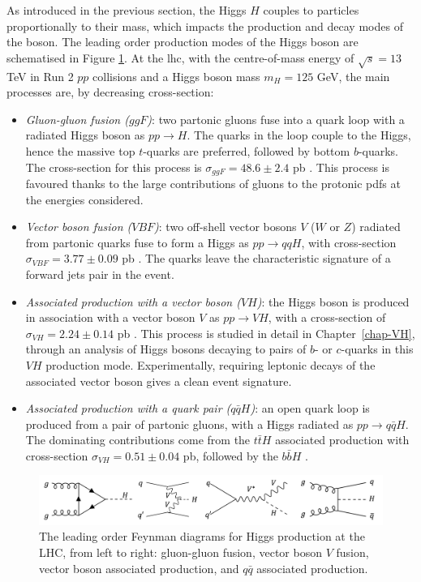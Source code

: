 As introduced in the previous section, the Higgs $H$ couples to particles proportionally to their mass, which impacts the production and decay modes of the boson. The leading order production modes of the Higgs boson are schematised in Figure \ref{fig:prodH}. At the \gls{lhc}, with the centre-of-mass energy of $\sqrt{s} = 13$ TeV in Run 2 $pp$ collisions and a Higgs boson mass $m_H = 125$ GeV, the main processes are, by decreasing cross-section: 
\begin{itemize}[leftmargin=*]
    \item \textit{Gluon-gluon fusion ($ggF$)}: two partonic gluons fuse into a quark loop with a radiated Higgs boson as $pp \rightarrow H$. The quarks in the loop couple to the Higgs, hence the massive top $t$-quarks are preferred, followed by bottom $b$-quarks. The cross-section for this process is $\sigma_{ggF} = 48.6 \pm 2.4$ pb \cite{LHCHiggsCrossSectionWorkingGroup:2016ypw}. This process is favoured thanks to the large contributions of gluons to the protonic \gls{pdf}s at the energies considered.
    \item \textit{Vector boson fusion ($VBF$)}: two off-shell vector bosons $V$ ($W$ or $Z$) radiated from partonic quarks fuse to form a Higgs as $pp \rightarrow qqH$, with cross-section $\sigma_{VBF} = 3.77 \pm 0.09$ pb \cite{LHCHiggsCrossSectionWorkingGroup:2016ypw}. The quarks leave the characteristic signature of a forward jets pair in the event.
    \item \textit{Associated production with a vector boson ($VH$)}: the Higgs boson is produced in association with a vector boson $V$ as $pp \rightarrow VH$, with a cross-section of $\sigma_{VH} = 2.24 \pm 0.14$ pb \cite{LHCHiggsCrossSectionWorkingGroup:2016ypw}. This process is studied in detail in Chapter~\ref{chap-VH}, through an analysis of Higgs bosons decaying to pairs of $b$- or $c$-quarks in this $VH$ production mode. Experimentally, requiring leptonic decays of the associated vector boson gives a clean event signature.
    \item \textit{Associated production with a quark pair ($q\bar{q}H$)}: an open quark loop is produced from a pair of partonic gluons, with a Higgs radiated as $pp \rightarrow q\bar{q}H$. The dominating contributions come from the $t\bar{t}H$ associated production with cross-section $\sigma_{VH} = 0.51 \pm 0.04$ pb, followed by the $b\bar{b}H$ \cite{LHCHiggsCrossSectionWorkingGroup:2016ypw}.
\end{itemize}

\begin{figure}[h!]
    \center
    \includegraphics[width=\textwidth]{Images/Theory/higgsprod.png}
    \caption{The leading order Feynman diagrams for Higgs production at the LHC, from left to right: gluon-gluon fusion, vector boson $V$ fusion, vector boson associated production, and $q\bar{q}$ associated production.}
    \label{fig:prodH}
\end{figure}

